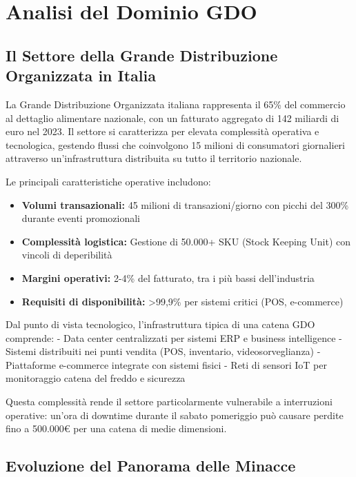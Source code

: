 
\chapter{Analisi del Dominio GDO}
\label{cap:analisi_dominio}

\section{Il Settore della Grande Distribuzione Organizzata in Italia}
\label{sec:settore_gdo}

La Grande Distribuzione Organizzata italiana rappresenta il 65\% del commercio al dettaglio alimentare nazionale, con un fatturato aggregato di 142 miliardi di euro nel 2023. Il settore si caratterizza per elevata complessità operativa e tecnologica, gestendo flussi che coinvolgono 15 milioni di consumatori giornalieri attraverso un'infrastruttura distribuita su tutto il territorio nazionale.

Le principali caratteristiche operative includono:
\begin{itemize}
\item \textbf{Volumi transazionali:} 45 milioni di transazioni/giorno con picchi del 300\% durante eventi promozionali
\item \textbf{Complessità logistica:} Gestione di 50.000+ SKU (Stock Keeping Unit) con vincoli di deperibilità
\item \textbf{Margini operativi:} 2-4\% del fatturato, tra i più bassi dell'industria
\item \textbf{Requisiti di disponibilità:} >99,9\% per sistemi critici (POS, e-commerce)
\end{itemize}

Dal punto di vista tecnologico, l'infrastruttura tipica di una catena GDO comprende:
- Data center centralizzati per sistemi ERP e business intelligence
- Sistemi distribuiti nei punti vendita (POS, inventario, videosorveglianza)
- Piattaforme e-commerce integrate con sistemi fisici
- Reti di sensori IoT per monitoraggio catena del freddo e sicurezza

Questa complessità rende il settore particolarmente vulnerabile a interruzioni operative: un'ora di downtime durante il sabato pomeriggio può causare perdite fino a 500.000€ per una catena di medie dimensioni.

\section{Evoluzione del Panorama delle Minacce}
\label{sec:minacce}

